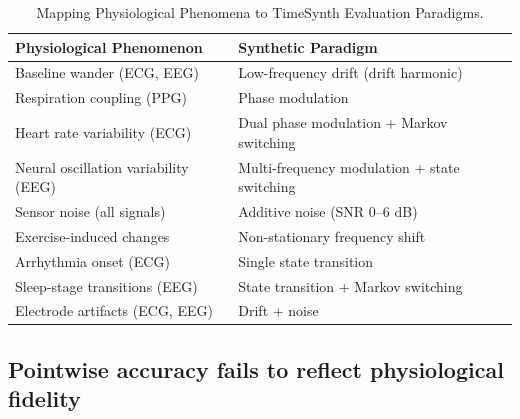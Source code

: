\begin{table}[ht]
\caption{Mapping Physiological Phenomena to TimeSynth Evaluation Paradigms.}\label{tab:table1}
\begin{tabular}{@{}ll@{}}
\toprule
\textbf{Physiological Phenomenon} & \textbf{Synthetic Paradigm} \\
\midrule
Baseline wander (ECG, EEG) & Low-frequency drift (drift harmonic) \\
Respiration coupling (PPG) & Phase modulation \\
Heart rate variability (ECG) & Dual phase modulation + Markov switching \\
Neural oscillation variability (EEG) & Multi-frequency modulation + state switching \\
Sensor noise (all signals) & Additive noise (SNR 0--6 dB) \\
Exercise-induced changes & Non-stationary frequency shift \\
Arrhythmia onset (ECG) & Single state transition \\
Sleep-stage transitions (EEG) & State transition + Markov switching \\
Electrode artifacts (ECG, EEG) & Drift + noise \\
\bottomrule
\end{tabular}
\end{table}


\subsection*{Pointwise accuracy fails to reflect physiological fidelity}

